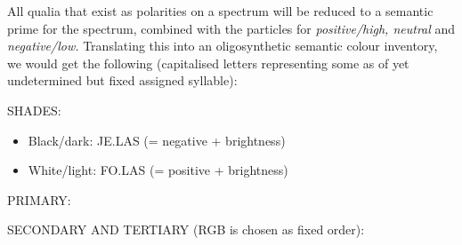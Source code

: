 All qualia that exist as polarities on a spectrum will be reduced to a semantic prime for the spectrum, combined with the particles for \textit{positive/high, neutral} and \textit{negative/low.} Translating this into an oligosynthetic semantic colour inventory, we would get the following (capitalised letters representing some as of yet undetermined but fixed assigned syllable): 

\vspace{0.1cm}

SHADES: 
\begin{itemize}

\item    Black/dark: JE.LAS \je \las (= negative + brightness) 

    \item White/light: FO.LAS \fo \las (= positive + brightness) 
\end{itemize}
\quad

PRIMARY: 
\quad


\noindent SECONDARY AND TERTIARY (RGB is chosen as fixed order): 


